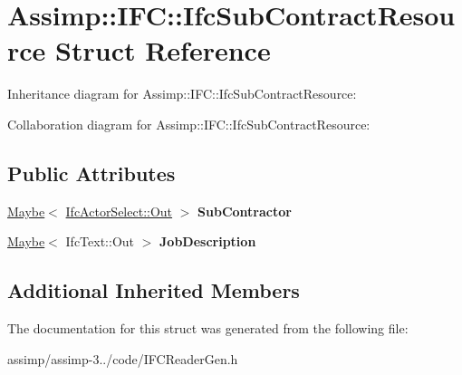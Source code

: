 \hypertarget{struct_assimp_1_1_i_f_c_1_1_ifc_sub_contract_resource}{\section{Assimp\+:\+:I\+F\+C\+:\+:Ifc\+Sub\+Contract\+Resource Struct Reference}
\label{struct_assimp_1_1_i_f_c_1_1_ifc_sub_contract_resource}
}


Inheritance diagram for Assimp\+:\+:I\+F\+C\+:\+:Ifc\+Sub\+Contract\+Resource\+:


Collaboration diagram for Assimp\+:\+:I\+F\+C\+:\+:Ifc\+Sub\+Contract\+Resource\+:
\subsection*{Public Attributes}
\begin{DoxyCompactItemize}
\item 
\hypertarget{struct_assimp_1_1_i_f_c_1_1_ifc_sub_contract_resource_a234d6c28244c141a22fdaa409b5c1651}{\hyperlink{struct_assimp_1_1_s_t_e_p_1_1_maybe}{Maybe}$<$ \hyperlink{classboost_1_1shared__ptr}{Ifc\+Actor\+Select\+::\+Out} $>$ {\bfseries Sub\+Contractor}}\label{struct_assimp_1_1_i_f_c_1_1_ifc_sub_contract_resource_a234d6c28244c141a22fdaa409b5c1651}

\item 
\hypertarget{struct_assimp_1_1_i_f_c_1_1_ifc_sub_contract_resource_a294227325e99ef78f06dfdeb6a3b00bb}{\hyperlink{struct_assimp_1_1_s_t_e_p_1_1_maybe}{Maybe}$<$ Ifc\+Text\+::\+Out $>$ {\bfseries Job\+Description}}\label{struct_assimp_1_1_i_f_c_1_1_ifc_sub_contract_resource_a294227325e99ef78f06dfdeb6a3b00bb}

\end{DoxyCompactItemize}
\subsection*{Additional Inherited Members}


The documentation for this struct was generated from the following file\+:\begin{DoxyCompactItemize}
\item 
assimp/assimp-\/3../code/I\+F\+C\+Reader\+Gen.\+h\end{DoxyCompactItemize}
